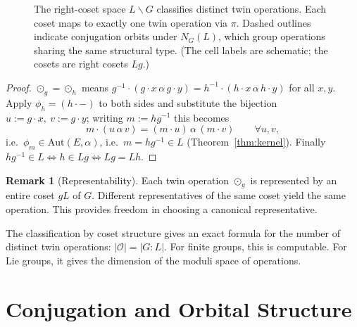 \documentclass[11pt,a4paper,openany]{book}
\theoremstyle{plain}
\theoremstyle{definition}
\newtheorem{remark}[theorem]{Remark}
\newcommand{\twing}[1]{\odot_{#1}}
\newcommand{\opspace}{\mathcal{O}}
\newcommand{\lingroup}{L}
\newcommand{\actspace}{E}
\newcommand{\groupG}{G}
\newcommand{\Aut}{\mathrm{Aut}}
\begin{document}
\begin{figure}[ht]
\caption{The right-coset space $\lingroup\backslash\groupG$ classifies distinct twin operations.
Each coset maps to exactly one twin operation via $\pi$. Dashed outlines indicate
conjugation orbits under $N_{\groupG}(\lingroup)$, which group operations sharing the same structural type. (The cell labels are schematic; the cosets are right cosets $\lingroup g$.)}
\label{fig:coset-classification}
\end{figure}


\begin{proof}
$\twing{g}=\twing{h}$ means $g^{-1}\cdot(g\cdot x\,\alpha\,g\cdot y)=h^{-1}\cdot(h\cdot x\,\alpha\,h\cdot y)$ for all $x,y$. Apply $\phi_h=(h\cdot{-})$ to both sides and substitute the bijection $u:=g\cdot x,\ v:=g\cdot y$; writing $m:=hg^{-1}$ this becomes
\[
m\cdot(u\,\alpha\,v)=(m\cdot u)\,\alpha\,(m\cdot v)\qquad\forall u,v,
\]
i.e.\ $\phi_m\in\Aut(\actspace,\alpha)$, i.e.\ $m=hg^{-1}\in\lingroup$ (Theorem~\ref{thm:kernel}). Finally $hg^{-1}\in\lingroup\iff h\in\lingroup g\iff\lingroup g=\lingroup h$.
\end{proof}

\begin{remark}[Representability]
Each twin operation $\twing{g}$ is represented by an entire coset $g\lingroup$ of $\groupG$. Different representatives of the same coset yield the same operation. This provides freedom in choosing a canonical representative.
\end{remark}

\begin{applicationbox}
The classification by coset structure gives an exact formula for the number of distinct twin operations: $|\opspace| = |\groupG : \lingroup|$. For finite groups, this is computable. For Lie groups, it gives the dimension of the moduli space of operations.
\end{applicationbox}

\section{Conjugation and Orbital Structure}
\end{document}
